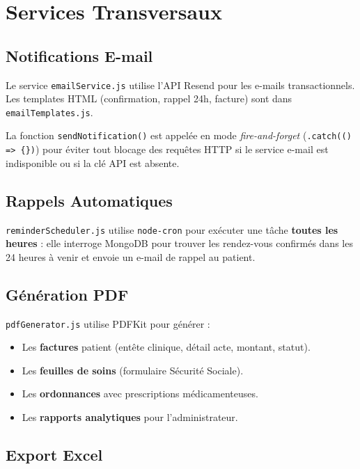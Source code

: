 \documentclass[12pt,a4paper]{report}
\begin{document}
\chapter{Services Transversaux}

\section{Notifications E-mail}

Le service \texttt{emailService.js} utilise l'API Resend pour les e-mails transactionnels. Les templates HTML (confirmation, rappel 24h, facture) sont dans \texttt{emailTemplates.js}.

La fonction \texttt{sendNotification()} est appelée en mode \textit{fire-and-forget} (\texttt{.catch(() => \{\})}) pour éviter tout blocage des requêtes HTTP si le service e-mail est indisponible ou si la clé API est absente.

\section{Rappels Automatiques}

\texttt{reminderScheduler.js} utilise \texttt{node-cron} pour exécuter une tâche \textbf{toutes les heures} : elle interroge MongoDB pour trouver les rendez-vous confirmés dans les 24 heures à venir et envoie un e-mail de rappel au patient.

\section{Génération PDF}

\texttt{pdfGenerator.js} utilise PDFKit pour générer :
\begin{itemize}[leftmargin=*,itemsep=2pt]
  \item Les \textbf{factures} patient (entête clinique, détail acte, montant, statut).
  \item Les \textbf{feuilles de soins} (formulaire Sécurité Sociale).
  \item Les \textbf{ordonnances} avec prescriptions médicamenteuses.
  \item Les \textbf{rapports analytiques} pour l'administrateur.
\end{itemize}

\section{Export Excel}
\end{document}
